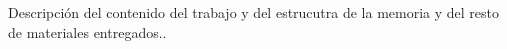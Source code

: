 
Descripción del contenido del trabajo y del estrucutra de la memoria y del resto de materiales entregados..
